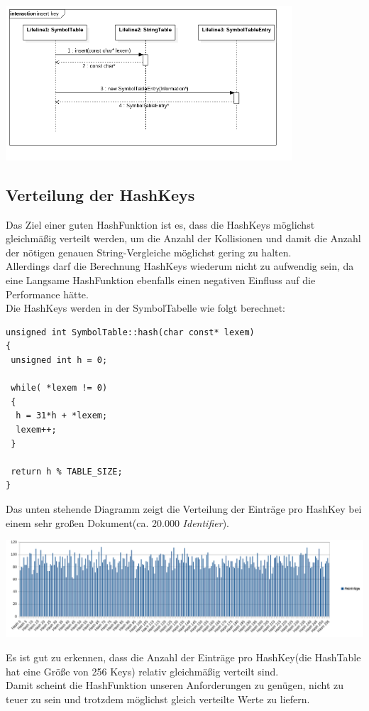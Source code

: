 \documentclass[
a4paper
]{scrreprt}
\begin{document}
	\begin{center}
		\includegraphics[width=0.8\textwidth]{./images/symtable_seq.png}
	\end{center}    
	
	\subsection*{Verteilung der HashKeys}
	Das Ziel einer guten HashFunktion ist es, dass die HashKeys möglichst gleichmäßig verteilt werden, um die Anzahl der Kollisionen und damit die Anzahl der nötigen genauen String-Vergleiche möglichst gering zu halten.\\
	
	Allerdings darf die Berechnung HashKeys wiederum nicht zu aufwendig sein, da eine Langsame HashFunktion ebenfalls einen negativen Einfluss auf die Performance hätte.\\
	Die HashKeys werden in der SymbolTabelle wie folgt berechnet:\\
	\pagebreak
	\begin{lstlisting}
unsigned int SymbolTable::hash(char const* lexem)
{
 unsigned int h = 0;
	
 while( *lexem != 0)
 {
  h = 31*h + *lexem;
  lexem++;
 }
	
 return h % TABLE_SIZE;
}
	\end{lstlisting}
	
	
	Das unten stehende Diagramm zeigt die Verteilung der Einträge pro HashKey bei einem sehr großen Dokument(ca. 20.000 \emph{Identifier}). 
	\begin{center}
		\includegraphics[width=\textwidth]{./charts/hashtable_distribution.png}
	\end{center}
	Es ist gut zu erkennen, dass die Anzahl der Einträge pro HashKey(die HashTable hat eine Größe von 256 Keys) relativ gleichmäßig verteilt sind.\\
	Damit scheint die HashFunktion unseren Anforderungen zu genügen, nicht zu teuer zu sein und trotzdem möglichst gleich verteilte Werte zu liefern.
	
\end{document}
